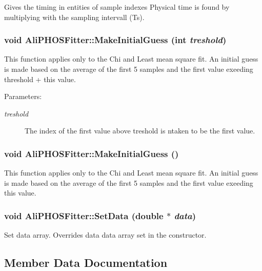 Gives the timing in entities of sample indexes Physical time is found by multiplying with the sampling intervall (Ts). 
\subsubsection{\setlength{\rightskip}{0pt plus 5cm}void Ali\-PHOSFitter::Make\-Initial\-Guess (int {\em treshold})\hspace{0.3cm}{\tt  [private]}}\label{classAliPHOSFitter_d1}


This function applies only to the Chi and Least mean square fit. An initial guess is made based on the average of the first 5 samples and the first value exeeding threshold + this value. \begin{Desc}
\item[Parameters:]
\begin{description}
\item[{\em treshold}]The index of the first value above treshold is ntaken to be the first value. \end{description}
\end{Desc}
\subsubsection{\setlength{\rightskip}{0pt plus 5cm}void Ali\-PHOSFitter::Make\-Initial\-Guess ()\hspace{0.3cm}{\tt  [private]}}\label{classAliPHOSFitter_d0}


This function applies only to the Chi and Least mean square fit. An initial guess is made based on the average of the first 5 samples and the first value exeeding this value. 
\subsubsection{\setlength{\rightskip}{0pt plus 5cm}void Ali\-PHOSFitter::Set\-Data (double $\ast$ {\em data})}\label{classAliPHOSFitter_a14}


Set data array. Overrides data data array set in the constructor. 

\subsection{Member Data Documentation}
